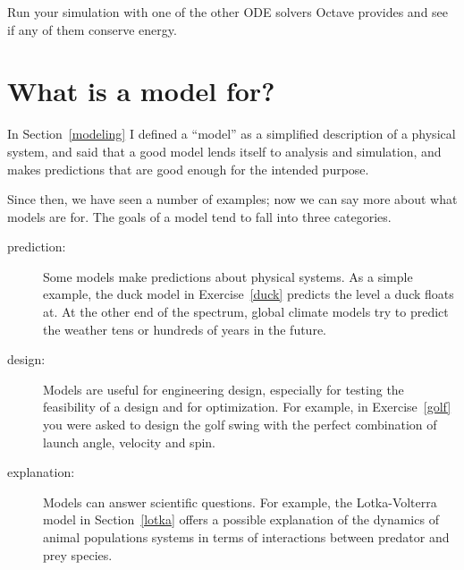 \documentclass{book}
\begin{document}
\begin{ex}
Run your simulation with one of the other ODE solvers Octave provides
and see if any of them conserve energy.
\end{ex}



\section{What is a model for?}

In Section~\ref{modeling} I defined a ``model'' as a simplified
description of a physical system, and said that a good model
lends itself to analysis and simulation, and makes predictions
that are good enough for the intended purpose.

Since then, we have seen a number of examples; now we can
say more about what models are for. The goals of a model tend
to fall into three categories.
 
\begin{description}

\item[prediction:] Some models make predictions about physical
systems. As a simple example, the duck model in
Exercise~\ref{duck} predicts the level a duck floats at. At the other
end of the spectrum, global climate models try to predict the weather
tens or hundreds of years in the future.

\item[design:] Models are useful for engineering design, especially
for testing the feasibility of a design and for optimization. For
example, in Exercise~\ref{golf} you were asked to design the golf
swing with the perfect combination of launch angle, velocity and spin.

\item[explanation:] Models can answer scientific questions. For
example, the Lotka-Volterra model in Section~\ref{lotka} offers a
possible explanation of the dynamics of animal populations systems in
terms of interactions between predator and prey species. 

\end{description}
\end{document}
